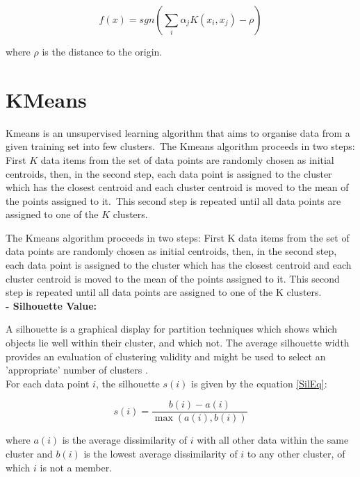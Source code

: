 			\begin{equation}
				f(x) = sgn (\sum_{i}\alpha_{j}K(x_{i},x_{j}) - \rho)
			\end{equation}
			
			where $\rho$ is the distance to the origin.

		\section{KMeans} \label{kmeans}

			Kmeans is an unsupervised learning algorithm that aims to organise data from a given training set into few clusters.\ The Kmeans algorithm proceeds in two steps: First $K$ data items from the set of data points are randomly chosen as initial centroids, then, in the second step, each data point is assigned to the cluster which has the closest centroid and each cluster centroid is moved to the mean of the points assigned to it.\ This second step is repeated until all data points are assigned to one of the $K$ clusters.

			The Kmeans algorithm proceeds in two steps: First K data items from the set of data points are randomly chosen as initial centroids, then, in the second step, each data point is assigned to the cluster which has the closest centroid and each cluster centroid is moved to the mean of the points assigned to it. This second step is repeated until all data points are assigned to one of the K clusters. \\

			\textbf{- Silhouette Value:}
			
				A silhouette is a graphical display for partition techniques which shows  which objects lie  well within their cluster, and which not. The average silhouette width provides an evaluation  of clustering validity and might be used to select an 'appropriate' number of clusters \cite{silhouette}.\\
			 For each data point $i$, the silhouette $s(i)$ is given by the equation \ref{SilEq}:
				
				\begin{equation} 
					s(i)=\frac{b(i)-a(i)}{\max(a(i),b(i))} 
					\label{SilEq}
				\end{equation}
						
				where $a(i)$ is the average dissimilarity of $i$ with all other data within the same cluster and $b(i)$ is the lowest average dissimilarity of $i$ to any other cluster, of which $i$ is not a member.